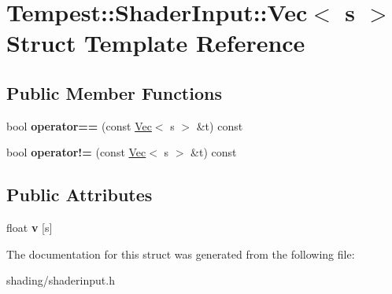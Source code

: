 \hypertarget{struct_tempest_1_1_shader_input_1_1_vec}{\section{Tempest\+:\+:Shader\+Input\+:\+:Vec$<$ s $>$ Struct Template Reference}
\label{struct_tempest_1_1_shader_input_1_1_vec}
}
\subsection*{Public Member Functions}
\begin{DoxyCompactItemize}
\item 
\hypertarget{struct_tempest_1_1_shader_input_1_1_vec_a6d45d36a5552b67c1204c44248b89ca3}{bool {\bfseries operator==} (const \hyperlink{struct_tempest_1_1_shader_input_1_1_vec}{Vec}$<$ s $>$ \&t) const }\label{struct_tempest_1_1_shader_input_1_1_vec_a6d45d36a5552b67c1204c44248b89ca3}

\item 
\hypertarget{struct_tempest_1_1_shader_input_1_1_vec_a9799121e2a8c34913edea48dcab483c7}{bool {\bfseries operator!=} (const \hyperlink{struct_tempest_1_1_shader_input_1_1_vec}{Vec}$<$ s $>$ \&t) const }\label{struct_tempest_1_1_shader_input_1_1_vec_a9799121e2a8c34913edea48dcab483c7}

\end{DoxyCompactItemize}
\subsection*{Public Attributes}
\begin{DoxyCompactItemize}
\item 
\hypertarget{struct_tempest_1_1_shader_input_1_1_vec_aad781d23e53df7dcecf0b9534d454165}{float {\bfseries v} \mbox{[}s\mbox{]}}\label{struct_tempest_1_1_shader_input_1_1_vec_aad781d23e53df7dcecf0b9534d454165}

\end{DoxyCompactItemize}


The documentation for this struct was generated from the following file\+:\begin{DoxyCompactItemize}
\item 
shading/shaderinput.\+h\end{DoxyCompactItemize}
